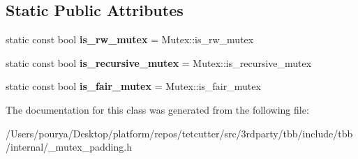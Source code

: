 \subsection*{Static Public Attributes}
\begin{DoxyCompactItemize}
\item 
\hypertarget{classtbb_1_1interface7_1_1internal_1_1padded__mutex_3_01Mutex_00_01false_01_4_a52bd3d1f7d0612853df162f9d1ae39de}{}static const bool {\bfseries is\+\_\+rw\+\_\+mutex} = Mutex\+::is\+\_\+rw\+\_\+mutex\label{classtbb_1_1interface7_1_1internal_1_1padded__mutex_3_01Mutex_00_01false_01_4_a52bd3d1f7d0612853df162f9d1ae39de}

\item 
\hypertarget{classtbb_1_1interface7_1_1internal_1_1padded__mutex_3_01Mutex_00_01false_01_4_a24ae190ee73aab436d7c8acaf020c55f}{}static const bool {\bfseries is\+\_\+recursive\+\_\+mutex} = Mutex\+::is\+\_\+recursive\+\_\+mutex\label{classtbb_1_1interface7_1_1internal_1_1padded__mutex_3_01Mutex_00_01false_01_4_a24ae190ee73aab436d7c8acaf020c55f}

\item 
\hypertarget{classtbb_1_1interface7_1_1internal_1_1padded__mutex_3_01Mutex_00_01false_01_4_a56c86b46e2660babbb2df741f587deff}{}static const bool {\bfseries is\+\_\+fair\+\_\+mutex} = Mutex\+::is\+\_\+fair\+\_\+mutex\label{classtbb_1_1interface7_1_1internal_1_1padded__mutex_3_01Mutex_00_01false_01_4_a56c86b46e2660babbb2df741f587deff}

\end{DoxyCompactItemize}


The documentation for this class was generated from the following file\+:\begin{DoxyCompactItemize}
\item 
/\+Users/pourya/\+Desktop/platform/repos/tetcutter/src/3rdparty/tbb/include/tbb/internal/\+\_\+mutex\+\_\+padding.\+h\end{DoxyCompactItemize}
